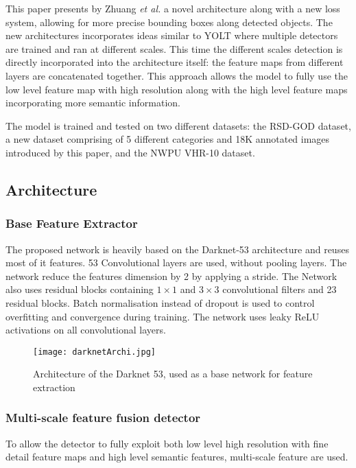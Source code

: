 
This paper presents by Zhuang \textit{et al.}\cite{zhuangAl} a novel architecture along with a new loss system, allowing for more precise bounding boxes along detected objects. The new architectures incorporates ideas similar to YOLT\cite{yolt} where multiple detectors are trained and ran at different scales. This time the different scales detection is directly incorporated into the architecture itself: the feature maps from different layers are concatenated together. This approach allows the model to fully use the low level feature map with high resolution along with the high level feature maps incorporating more semantic information.

The model is trained and tested on two different datasets: the RSD-GOD dataset, a new dataset comprising of 5 different categories and 18K annotated images introduced by this paper, and the NWPU VHR-10\cite{nwpu} dataset.

\subsection{Architecture}
\subsubsection{Base Feature Extractor}
The proposed network is heavily based on the Darknet-53 architecture and reuses most of it features. 53 Convolutional layers are used, without pooling layers. The network reduce the features dimension by 2 by applying a stride. The Network also uses residual blocks containing $1 \times 1$ and $3 \times 3$ convolutional filters and 23 residual blocks. Batch normalisation\cite{batchNorm} instead of dropout is used to control overfitting and convergence during training. The network uses leaky ReLU activations on all convolutional layers. 

\begin{figure}[h!]
	\centering
	\texttt{[image: darknetArchi.jpg]}
	\caption[Architecture of the Darknet 53, used as a base network for features extraction in the Single-Shot Object Detection Framework]{Architecture of the Darknet 53, used as a base network for feature extraction}
	\label{}
\end{figure}

\subsubsection{Multi-scale feature fusion detector}
To allow the detector to fully exploit both low level high resolution with fine detail feature maps and high level semantic features, multi-scale feature are used. 


